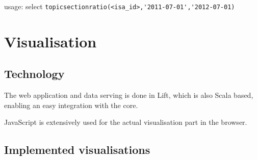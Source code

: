 usage: select \verb|topicsectionratio(<isa_id>,'2011-07-01','2012-07-01)|

\chapter{Visualisation}

\section{Technology}
The web application and data serving is done in Lift, which is also Scala based, enabling an easy integration with the core.

JavaScript is extensively used for the actual visualisation part in the browser.

\section{Implemented visualisations}



